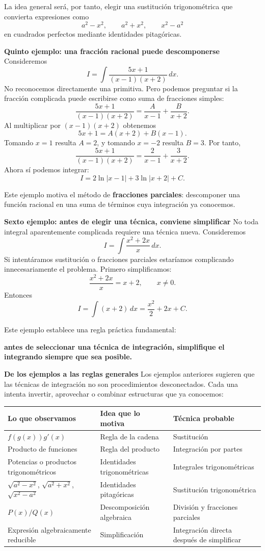 \documentclass[12pt]{article}
\theoremstyle{definition}
\theoremstyle{remark}
\begin{document}
La idea general será, por tanto, elegir una sustitución trigonométrica que convierta expresiones como
\[
a^2-x^2,\qquad a^2+x^2,\qquad x^2-a^2
\]
en cuadrados perfectos mediante identidades pitagóricas.

\textbf{Quinto ejemplo: una fracción racional puede descomponerse}
Consideremos
\[
I=\int\frac{5x+1}{(x-1)(x+2)}\,dx.
\]
No reconocemos directamente una primitiva. Pero podemos preguntar si la fracción complicada puede escribirse como suma de fracciones simples:
\[
\frac{5x+1}{(x-1)(x+2)}
=\frac{A}{x-1}+\frac{B}{x+2}.
\]
Al multiplicar por $(x-1)(x+2)$ obtenemos
\[
5x+1=A(x+2)+B(x-1).
\]
Tomando $x=1$ resulta $A=2$, y tomando $x=-2$ resulta $B=3$. Por tanto,
\[
\frac{5x+1}{(x-1)(x+2)}=\frac2{x-1}+\frac3{x+2}.
\]
Ahora sí podemos integrar:
\[
I=2\ln|x-1|+3\ln|x+2|+C.
\]

Este ejemplo motiva el método de \textbf{fracciones parciales}: descomponer una función racional en una suma de términos cuya integración ya conocemos.

\textbf{Sexto ejemplo: antes de elegir una técnica, conviene simplificar}
No toda integral aparentemente complicada requiere una técnica nueva. Consideremos
\[
I=\int\frac{x^2+2x}{x}\,dx.
\]
Si intentáramos sustitución o fracciones parciales estaríamos complicando innecesariamente el problema. Primero simplificamos:
\[
\frac{x^2+2x}{x}=x+2,\qquad x\neq0.
\]
Entonces
\[
I=\int(x+2)\,dx
=\boxed{\frac{x^2}{2}+2x+C}.
\]

Este ejemplo establece una regla práctica fundamental:
\begin{center}
\textbf{antes de seleccionar una técnica de integración, simplifique el integrando siempre que sea posible.}
\end{center}

\textbf{De los ejemplos a las reglas generales}
Los ejemplos anteriores sugieren que las técnicas de integración no son procedimientos desconectados. Cada una intenta invertir, aprovechar o combinar estructuras que ya conocemos:

\begin{center}
\begin{tabular}{p{}p{}p{}}
\toprule
\textbf{Lo que observamos} & \textbf{Idea que lo motiva} & \textbf{Técnica probable}\\
\midrule
$f(g(x))g'(x)$ & Regla de la cadena & Sustitución\\
Producto de funciones & Regla del producto & Integración por partes\\
Potencias o productos trigonométricos & Identidades trigonométricas & Integrales trigonométricas\\
$\sqrt{a^2-x^2}$, $\sqrt{a^2+x^2}$, $\sqrt{x^2-a^2}$ & Identidades pitagóricas & Sustitución trigonométrica\\
$P(x)/Q(x)$ & Descomposición algebraica & División y fracciones parciales\\
Expresión algebraicamente reducible & Simplificación & Integración directa después de simplificar\\
\bottomrule
\end{tabular}
\end{center}
\end{document}
